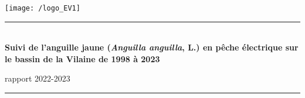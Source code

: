 \documentclass[10pt,twocolumn,titlepage,twoside]{article}\usepackage[]{graphicx}\usepackage[]{color}
\begin{document}
\newpage
{}
\thispagestyle{empty}
\pagecolor{bleu_EV}
\begin{minipage}{\textwidth}
\vspace{30pt}
\hspace{30pt}
\texttt{[image: /logo\_EV1]}
\end{minipage}

\begin{minipage}{0.1\textwidth}
\phantom{This text will be invisible}
\end{minipage}
\begin{minipage}{0.8\textwidth}
\begin{center}
\noindent
{\color{turquoise_EV}\rule{\textwidth}{2.5pt}}\\
\vspace{8mm}
\color{white}
\color{white}
{ \titlefont \huge  \bfseries{Suivi de l'anguille jaune (\textit{Anguilla anguilla}, L.) en pêche
électrique sur le bassin de la Vilaine de 1998 à 2023\\
    }}
\bigskip
{\titlefont  \LARGE rapport 2022-2023\par }
\vspace{4mm}\noindent
{\color{turquoise_EV}\rule{0.9\textwidth}{1.8pt}}\par
\vspace{5mm}
{}
\end{center}
\end{minipage}



\vspace{2cm}%

\begin{minipage}{\textwidth}
\begin{center}
\end{center}
\end{minipage}

\vspace{2cm}%

\begin{minipage}{0.8\textwidth}
\begin{center}
\end{center}
\end{minipage}
\restoregeometry
\clearpage
\normalsize
\pagecolor{white}
\end{document}
